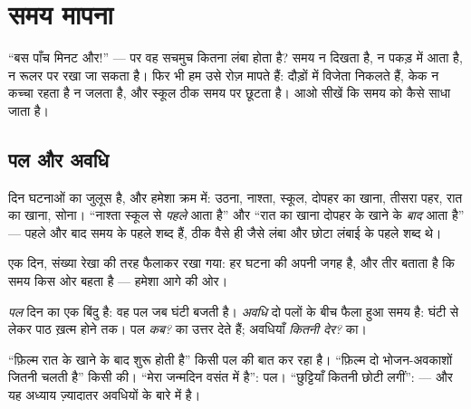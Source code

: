 \chapter{समय मापना}\label{ch:g2:measuring-time}

``बस पाँच मिनट और!'' --- पर वह सचमुच कितना लंबा होता है? समय न दिखता
है, न पकड़ में आता है, न रूलर पर रखा जा सकता है। फिर भी हम उसे रोज़
मापते हैं: दौड़ों में विजेता निकलते हैं, केक न कच्चा रहता है न जलता
है, और स्कूल ठीक समय पर छूटता है। आओ सीखें कि समय को कैसे साधा जाता
है।

\section{पल और अवधि}

\begin{example}[दिन का क्रम]\label{ex:g2:measuring-time:order}
दिन घटनाओं का जुलूस है, और हमेशा क्रम में: उठना, नाश्ता, स्कूल,
दोपहर का खाना, तीसरा पहर, रात का खाना, सोना। ``नाश्ता स्कूल से
\emph{पहले} आता है'' और ``रात का खाना दोपहर के खाने के \emph{बाद}
आता है'' --- पहले और बाद समय के पहले शब्द हैं, ठीक वैसे ही जैसे लंबा
और छोटा लंबाई के पहले शब्द थे।
\end{example}

\begin{omfigure}

{\small एक दिन, संख्या रेखा की तरह फैलाकर रखा गया: हर घटना की अपनी
जगह है, और तीर बताता है कि समय किस ओर बहता है --- हमेशा आगे की ओर।}
\end{omfigure}

\begin{definition}[अवधि]\label{def:g2:measuring-time:duration}
\emph{पल} दिन का एक बिंदु है: वह पल जब घंटी बजती है।
\emph{अवधि} दो पलों के बीच फैला हुआ समय है: घंटी से लेकर
पाठ ख़त्म होने तक। पल \emph{कब?} का उत्तर देते हैं; अवधियाँ
\emph{कितनी देर?} का।
\end{definition}

\begin{example}[कब, या कितनी देर?]\label{ex:g2:measuring-time:whenhowlong}
``फ़िल्म रात के खाने के बाद शुरू होती है'' किसी पल की बात कर रहा है।
``फ़िल्म दो भोजन-अवकाशों जितनी चलती है'' किसी  की। ``मेरा जन्मदिन
वसंत में है'': पल। ``छुट्टियाँ कितनी छोटी लगीं'':  --- और यह
अध्याय ज़्यादातर अवधियों के बारे में है।
\end{example}


